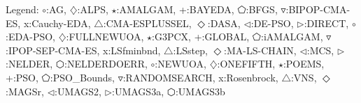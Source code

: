 Legend: {\color{CornflowerBlue}$\circ$}:AG, {\color{Orange}$\diamondsuit$}:ALPS, {\color{Green}$\star$}:AMALGAM, {\color{red}+}:BAYEDA, {\color{magenta}$\pentagon$}:BFGS, {\color{brown}$\triangledown$}:BIPOP-CMA-ES, {{}x}:Cauchy-EDA, {{}$\triangle$}:CMA-ESPLUSSEL, {{}$\Diamond$}:DASA, {{}$\triangleleft$}:DE-PSO, {{}$\triangleright$}:DIRECT, {{}$\circ$}:EDA-PSO, {{}$\diamondsuit$}:FULLNEWUOA, {{}$\star$}:G3PCX, {{}+}:GLOBAL, {{}$\pentagon$}:iAMALGAM, {{}$\triangledown$}:IPOP-SEP-CMA-ES, {{}x}:LSfminbnd, {{}$\triangle$}:LSstep, {{}$\Diamond$}:MA-LS-CHAIN, {{}$\triangleleft$}:MCS, {\color{CornflowerBlue}$\triangleright$}:NELDER, {\color{Orange}$\varhexagon$}:NELDERDOERR, {\color{Green}$\circ$}:NEWUOA, {\color{red}$\diamondsuit$}:ONEFIFTH, {\color{magenta}$\star$}:POEMS, {\color{brown}+}:PSO, {{}$\pentagon$}:PSO\_Bounds, {{}$\triangledown$}:RANDOMSEARCH, {{}x}:Rosenbrock, {{}$\triangle$}:VNS, {{}$\Diamond$}:MAGSr, {{}$\triangleleft$}:UMAGS2, {{}$\triangleright$}:UMAGS3a, {{}$\varhexagon$}:UMAGS3b